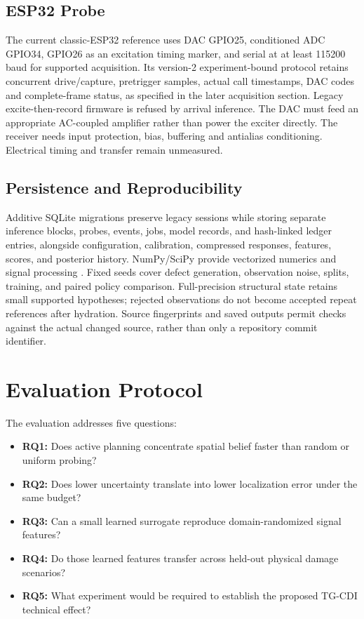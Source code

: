 \documentclass[conference]{IEEEtran}
\begin{document}
\subsection{ESP32 Probe}
The current classic-ESP32 reference uses DAC GPIO25, conditioned ADC GPIO34, GPIO26 as an excitation timing marker, and serial at at least 115200 baud for supported acquisition. Its version-2 experiment-bound protocol retains concurrent drive/capture, pretrigger samples, actual call timestamps, DAC codes and complete-frame status, as specified in the later acquisition section. Legacy excite-then-record firmware is refused by arrival inference. The DAC must feed an appropriate AC-coupled amplifier rather than power the exciter directly. The receiver needs input protection, bias, buffering and antialias conditioning. Electrical timing and transfer remain unmeasured.

\subsection{Persistence and Reproducibility}
Additive SQLite migrations preserve legacy sessions while storing separate inference blocks, probes, events, jobs, model records, and hash-linked ledger entries, alongside configuration, calibration, compressed responses, features, scores, and posterior history. NumPy/SciPy provide vectorized numerics and signal processing \cite{harris2020,virtanen2020}. Fixed seeds cover defect generation, observation noise, splits, training, and paired policy comparison. Full-precision structural state retains small supported hypotheses; rejected observations do not become accepted repeat references after hydration. Source fingerprints and saved outputs permit checks against the actual changed source, rather than only a repository commit identifier.

\section{Evaluation Protocol}
The evaluation addresses five questions:
\begin{itemize}
    \item \textbf{RQ1:} Does active planning concentrate spatial belief faster than random or uniform probing?
    \item \textbf{RQ2:} Does lower uncertainty translate into lower localization error under the same budget?
    \item \textbf{RQ3:} Can a small learned surrogate reproduce domain-randomized signal features?
    \item \textbf{RQ4:} Do those learned features transfer across held-out physical damage scenarios?
    \item \textbf{RQ5:} What experiment would be required to establish the proposed TG-CDI technical effect?
\end{itemize}
\end{document}
